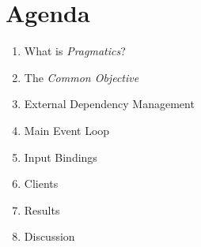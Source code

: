 
\section{Agenda}

\begin{frame}[c]{\insertsection}

    \begin{enumerate}
        \item What is \textit{Pragmatics}?
        \item The \textit{Common Objective}
        \item External Dependency Management
        \item Main Event Loop
        \item Input Bindings
        \item Clients
        \item Results
        \item Discussion
    \end{enumerate}

\end{frame}
